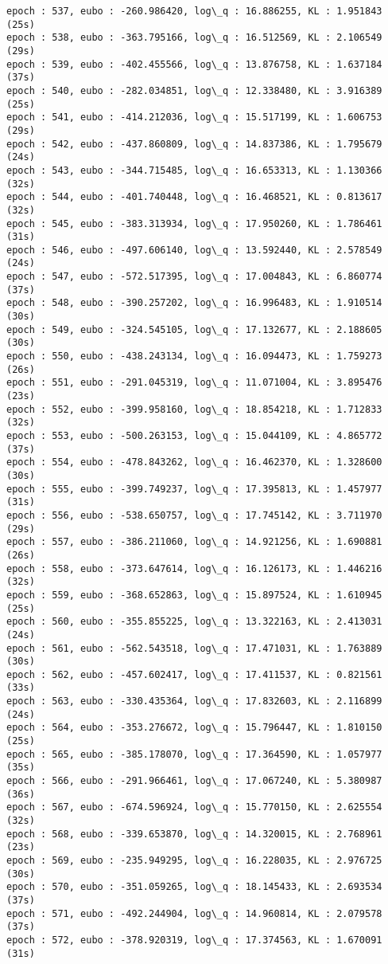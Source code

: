 \documentclass[11pt]{article}
\begin{document}
\begin{Verbatim}[commandchars=\\\{\}]
epoch : 537, eubo : -260.986420, log\_q : 16.886255, KL : 1.951843 (25s)
epoch : 538, eubo : -363.795166, log\_q : 16.512569, KL : 2.106549 (29s)
epoch : 539, eubo : -402.455566, log\_q : 13.876758, KL : 1.637184 (37s)
epoch : 540, eubo : -282.034851, log\_q : 12.338480, KL : 3.916389 (25s)
epoch : 541, eubo : -414.212036, log\_q : 15.517199, KL : 1.606753 (29s)
epoch : 542, eubo : -437.860809, log\_q : 14.837386, KL : 1.795679 (24s)
epoch : 543, eubo : -344.715485, log\_q : 16.653313, KL : 1.130366 (32s)
epoch : 544, eubo : -401.740448, log\_q : 16.468521, KL : 0.813617 (32s)
epoch : 545, eubo : -383.313934, log\_q : 17.950260, KL : 1.786461 (31s)
epoch : 546, eubo : -497.606140, log\_q : 13.592440, KL : 2.578549 (24s)
epoch : 547, eubo : -572.517395, log\_q : 17.004843, KL : 6.860774 (37s)
epoch : 548, eubo : -390.257202, log\_q : 16.996483, KL : 1.910514 (30s)
epoch : 549, eubo : -324.545105, log\_q : 17.132677, KL : 2.188605 (30s)
epoch : 550, eubo : -438.243134, log\_q : 16.094473, KL : 1.759273 (26s)
epoch : 551, eubo : -291.045319, log\_q : 11.071004, KL : 3.895476 (23s)
epoch : 552, eubo : -399.958160, log\_q : 18.854218, KL : 1.712833 (32s)
epoch : 553, eubo : -500.263153, log\_q : 15.044109, KL : 4.865772 (37s)
epoch : 554, eubo : -478.843262, log\_q : 16.462370, KL : 1.328600 (30s)
epoch : 555, eubo : -399.749237, log\_q : 17.395813, KL : 1.457977 (31s)
epoch : 556, eubo : -538.650757, log\_q : 17.745142, KL : 3.711970 (29s)
epoch : 557, eubo : -386.211060, log\_q : 14.921256, KL : 1.690881 (26s)
epoch : 558, eubo : -373.647614, log\_q : 16.126173, KL : 1.446216 (32s)
epoch : 559, eubo : -368.652863, log\_q : 15.897524, KL : 1.610945 (25s)
epoch : 560, eubo : -355.855225, log\_q : 13.322163, KL : 2.413031 (24s)
epoch : 561, eubo : -562.543518, log\_q : 17.471031, KL : 1.763889 (30s)
epoch : 562, eubo : -457.602417, log\_q : 17.411537, KL : 0.821561 (33s)
epoch : 563, eubo : -330.435364, log\_q : 17.832603, KL : 2.116899 (24s)
epoch : 564, eubo : -353.276672, log\_q : 15.796447, KL : 1.810150 (25s)
epoch : 565, eubo : -385.178070, log\_q : 17.364590, KL : 1.057977 (35s)
epoch : 566, eubo : -291.966461, log\_q : 17.067240, KL : 5.380987 (36s)
epoch : 567, eubo : -674.596924, log\_q : 15.770150, KL : 2.625554 (32s)
epoch : 568, eubo : -339.653870, log\_q : 14.320015, KL : 2.768961 (23s)
epoch : 569, eubo : -235.949295, log\_q : 16.228035, KL : 2.976725 (30s)
epoch : 570, eubo : -351.059265, log\_q : 18.145433, KL : 2.693534 (37s)
epoch : 571, eubo : -492.244904, log\_q : 14.960814, KL : 2.079578 (37s)
epoch : 572, eubo : -378.920319, log\_q : 17.374563, KL : 1.670091 (31s)

\end{Verbatim}
\end{document}
